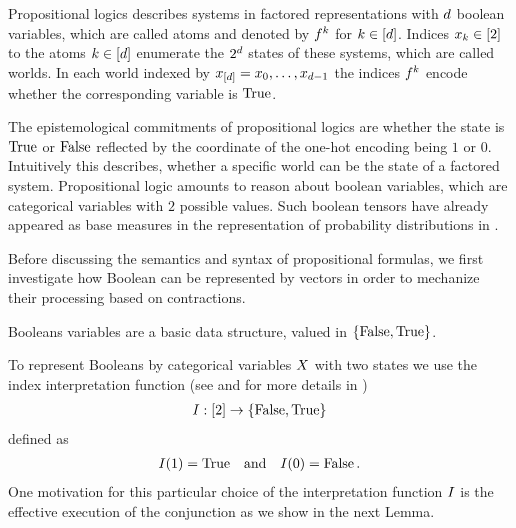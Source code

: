 \chapter{\chatextlogicalRepresentation}\label{cha:logicalRepresentation}

Propositional logics describes systems in factored representations with $d$ boolean variables, which are called atoms and denoted by $f^{k}$ for $k\in[d]$.
Indices $x_{k}\in[2]$ to the atoms $k\in[d]$ enumerate the $2^d$ states of these systems, which are called worlds.
In each world indexed by $x_{[d]}=x_{0},\ldots,x_{d-1}$ the indices $f^{k}$ encode whether the corresponding variable is $\mathrm{True}$.

The epistemological commitments of propositional logics are whether the state is $\mathrm{True}$ or $\mathrm{False}$ reflected by the coordinate of the one-hot encoding being $1$ or $0$.
Intuitively this describes, whether a specific world can be the state of a factored system.
Propositional logic amounts to reason about boolean variables, which are categorical variables with $2$ possible values.
Such boolean tensors have already appeared as base measures in the representation of probability distributions in .

Before discussing the semantics and syntax of propositional formulas, we first investigate how Boolean can be represented by vectors in order to mechanize their processing based on contractions.



\label{sec:booleanEncoding}

Booleans variables are a basic data structure, valued in $\{\mathrm{False},\mathrm{True}\}$.


To represent Booleans by categorical variables $X$ with two states we use the index interpretation function (see  and for more details  in )
\begin{align*}
    \indexinterpretation:[2]\rightarrow\truthset%
\end{align*}
defined as
\begin{align*}
    \indexinterpretationat{1} = \truesymbol%
    \quad \text{and} \quad \indexinterpretationat{0} = \falsesymbol \, .
\end{align*}
One motivation for this particular choice of the interpretation function $I$ is the effective execution of the conjunction as we show in the next Lemma.

